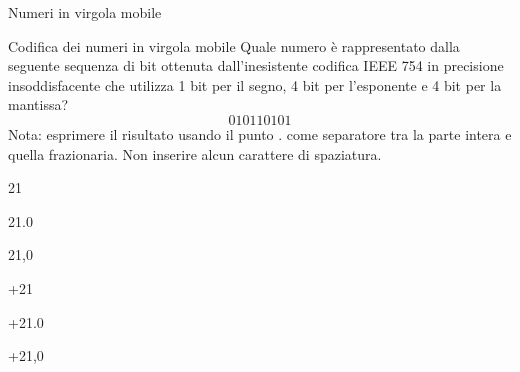 \documentclass[11pt]{article}
\begin{document}
\begin{quiz}{Numeri in virgola mobile}
\begin{shortanswer}[points=1]{Codifica dei numeri in virgola mobile}
Quale numero \`{e} rappresentato dalla seguente sequenza di bit ottenuta dall'inesistente codifica IEEE 754 in precisione
insoddisfacente che utilizza 1 bit per il segno, 4 bit per l'esponente e 4 bit per la mantissa?
$$ 010110101 $$
Nota: esprimere il risultato usando il punto . come separatore tra la parte intera e quella frazionaria. Non inserire alcun carattere di spaziatura.
\item[] 21
\item[] 21.0
\item[] 21,0
\item[] +21
\item[] +21.0
\item[] +21,0
\end{shortanswer}


\end{quiz}
\end{document}
